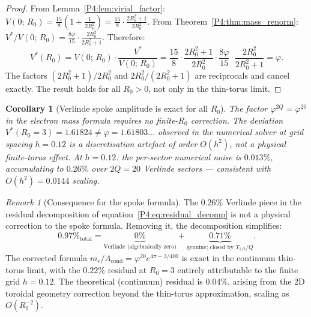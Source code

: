 \documentclass[11pt,a4paper]{article}
\newtheorem{corollary}[theorem]{Corollary}
\theoremstyle{definition}
\theoremstyle{remark}
\newtheorem{remark}[theorem]{Remark}
\newcommand{\vp}{\varphi}
\newcommand{\Lcond}{\Lambda_{\mathrm{cond}}}
\begin{document}
\begin{proof}
From Lemma~\ref{P4:lem:virial_factor}:
$V(0;\,R_0) = \tfrac{15}{8}(1 + \tfrac{1}{2R_0^2})
= \tfrac{15}{8}\cdot\tfrac{2R_0^2+1}{2R_0^2}$.
From Theorem~\ref{P4:thm:mass_renorm}:
$V^*/V(0;\,R_0) = \tfrac{8\vp}{15}\cdot\tfrac{2R_0^2}{2R_0^2+1}$.
Therefore:
\begin{equation}
  V^*(R_0)
  = V(0;\,R_0)\cdot\frac{V^*}{V(0;\,R_0)}
  = \frac{15}{8}\cdot\frac{2R_0^2+1}{2R_0^2}
    \cdot\frac{8\vp}{15}\cdot\frac{2R_0^2}{2R_0^2+1}
  = \vp.
  \label{P4:eq:cancellation_proof}
\end{equation}
The factors $(2R_0^2+1)/2R_0^2$ and $2R_0^2/(2R_0^2+1)$ are
reciprocals and cancel exactly.
The result holds for all $R_0 > 0$, not only in the thin-torus limit.
\end{proof}

\begin{corollary}[Verlinde spoke amplitude is exact for all $R_0$]
\label{P4:cor:verlinde_exact}
The factor $\vp^{2Q} = \vp^{20}$ in the electron mass formula
requires no finite-$R_0$ correction.
The deviation $V^*(R_0{=}3) = 1.61824 \neq \vp = 1.61803\ldots$
observed in the numerical solver at grid spacing $h = 0.12$
is a discretisation artefact of order $O(h^2)$, not a physical
finite-torus effect.
At $h=0.12$: the per-sector numerical noise is $0.013\%$,
accumulating to $0.26\%$ over $2Q=20$ Verlinde sectors ---
consistent with $O(h^2) = 0.0144$ scaling.
\end{corollary}

\begin{remark}[Consequence for the spoke formula]
The $0.26\%$ Verlinde piece in the residual decomposition
of equation~\eqref{P4:eq:residual_decomp} is not a physical
correction to the spoke formula.
Removing it, the decomposition simplifies:
\begin{equation}
  0.97\%_{\text{total}}
  = \underbrace{0\%}_{\text{Verlinde (algebraically zero)}}
  + \underbrace{0.71\%}_{\text{genuine; closed by }T_{1/2}/Q}.
  \label{P4:eq:residual_corrected}
\end{equation}
The corrected formula $m_e/\Lcond = \vp^{20}e^{4\pi-3/400}$ is exact
in the continuum thin-torus limit, with the $0.22\%$ residual at
$R_0=3$ entirely attributable to the finite grid $h=0.12$.
The theoretical (continuum) residual is $0.04\%$, arising from the
2D toroidal geometry correction beyond the thin-torus approximation,
scaling as $O(R_0^{-2})$.
\end{remark}
\end{document}
